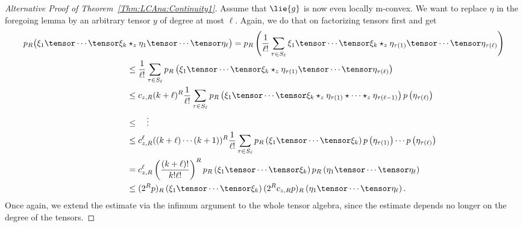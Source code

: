 \begin{proof}[Alternative Proof of Theorem~\ref{Thm:LCAna:Continuity1}]
    Assume that $\lie{g}$ is now even locally m-convex.  We want to
    replace $\eta$ in the foregoing lemma by an arbitrary tensor $y$
    of degree at most $\ell$. Again, we do that on factorizing tensors
    first and get
    \begin{align*}
        p_R \big(
         	\xi_1 \tensor \cdots \tensor \xi_k 
		&
         	\ostar_z 
         	\eta_1 \tensor \cdots \tensor \eta_\ell
        \big)
        =
        p_R \left(
	        \frac{1}{\ell !}
         	\sum\limits_{\tau \in S_\ell}
         	\xi_1 \tensor \cdots \tensor \xi_k 
         	\ostar_z
         	\eta_{\tau(1)} \tensor \cdots \tensor \eta_{\tau(\ell)}
        \right)
        \\
        & \leq
        \frac{1}{\ell !}
        \sum\limits_{\tau \in S_\ell}
        p_R \left(
         	\xi_1 \tensor \cdots \tensor \xi_k 
         	\ostar_z
         	\eta_{\tau(1)} \tensor \cdots \tensor \eta_{\tau(\ell)}
        \right)
        \\
        & \leq
        c_{z,R} (k + \ell)^R
        \frac{1}{\ell !}
        \sum\limits_{\tau \in S_\ell}
        p_R \left(
         	\xi_1 \tensor \cdots \tensor \xi_k 
         	\ostar_z 
         	\eta_{\tau(1)} \ostar \cdots \ostar_z \eta_{\tau(\ell - 1)}
        \right)
        p\left( \eta_{\tau(\ell)} \right)
        \\
        & \leq
        \quad \vdots
        \\
        & \leq
        c_{z,R}^{\ell} ((k + \ell) \cdots (k + 1))^R
        \frac{1}{\ell !}
        \sum\limits_{\tau \in S_\ell}
        p_R \left( \xi_1 \tensor \cdots \tensor \xi_k \right)
        p \left( \eta_{\tau(1)} \right)
        \cdots
        p \left( \eta_{\tau(\ell)} \right)
        \\
        & =
        c_{z,R}^{\ell} \left(
        \frac{(k + \ell)!}{k! \ell!}
        \right)^R
        p_R \left( \xi_1 \tensor \cdots \tensor \xi_k \right)
        p_R \left( \eta_1 \tensor \cdots \tensor \eta_\ell \right)
        \\
        & \leq
        (2^R p)_R 
        \left( \xi_1 \tensor \cdots \tensor \xi_k \right)
        (2^R c_{z,R} p)_R 
        \left( \eta_1 \tensor \cdots \tensor \eta_\ell \right).
    \end{align*}
    Once again, we extend the estimate via the infimum argument to the whole
    tensor algebra, since the estimate depends no longer on the degree
    of the tensors.
\end{proof}


